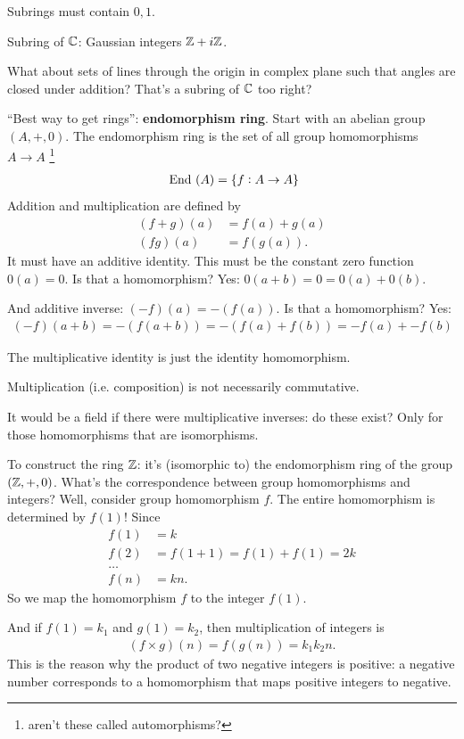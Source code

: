 Subrings must contain $0, 1$.

Subring of $\mathbb{C}$: Gaussian integers $\mathbb{Z} + i\mathbb{Z}$.

What about sets of lines through the origin in complex plane such that angles
are closed under addition? That's a subring of $\mathbb{C}$ too right?

``Best way to get rings'': \textbf{endomorphism ring}. Start with an abelian
group $(A, +, 0)$. The endomorphism ring is the set of all group homomorphisms
$A \to A$ \footnote{aren't these called automorphisms?}
\begin{align*}
~\text{End}~(A) = \{f: A \to A\}
\end{align*}
Addition and multiplication are defined by
\begin{align*}
  (f + g)(a) &= f(a) + g(a)\\
  (fg)(a)    &= f(g(a)).
\end{align*}
It must have an additive identity. This must be the constant zero function
$0(a) = 0$. Is that a homomorphism? Yes: $0(a + b) = 0 = 0(a) + 0(b)$.

And additive inverse: $(-f)(a) = -(f(a))$. Is that a homomorphism? Yes:
\begin{align*}
  (-f)(a + b) = -(f(a + b)) = -(f(a) + f(b)) = -f(a) + -f(b)
\end{align*}

The multiplicative identity is just the identity homomorphism.

Multiplication (i.e. composition) is not necessarily commutative.

It would be a field if there were multiplicative inverses: do these exist? Only
for those homomorphisms that are isomorphisms.

To construct the ring $\mathbb{Z}$: it's (isomorphic to) the endomorphism ring of the
group $(\mathbb{Z}, +, 0)$. What's the correspondence between group homomorphisms and
integers? Well, consider group homomorphism $f$. The entire homomorphism is
determined by $f(1)$! Since
\begin{align*}
  f(1) &= k\\
  f(2) &= f(1 + 1) = f(1) + f(1) = 2k\\
       \ldots\\
  f(n) &= kn.
\end{align*}
So we map the homomorphism $f$ to the integer $f(1)$.

And if $f(1) = k_1$ and $g(1) = k_2$, then multiplication of integers is
\begin{align*}
  (f \times g)(n) = f(g(n)) = k_1k_2n.
\end{align*}
This is the reason why the product of two negative integers is positive: a
negative number corresponds to a homomorphism that maps positive integers to
negative.

